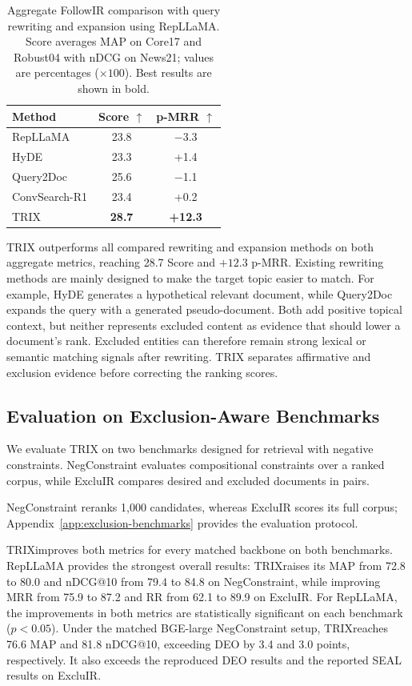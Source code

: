 \documentclass[letterpaper]{article}
\newcommand{\method}{\ifmmode \mathrm{TRIX}\else TRIX\xspace\fi}
\begin{document}
\begin{table}[t]
\centering
\small
\setlength{\tabcolsep}{5pt}
\begin{tabular}{lcc}
\toprule
\textbf{Method} & \textbf{Score $\uparrow$} & \textbf{p-MRR $\uparrow$} \\
\midrule
RepLLaMA & 23.8 & $-$3.3 \\
HyDE & 23.3 & +1.4 \\
Query2Doc & 25.6 & $-$1.1 \\
ConvSearch-R1 & 23.4 & +0.2 \\
\method{} & \textbf{28.7} & \textbf{+12.3} \\
\bottomrule
\end{tabular}
\caption{Aggregate FollowIR comparison with query rewriting and expansion
using RepLLaMA.  Score averages MAP on Core17 and Robust04 with nDCG on
News21; values are percentages ($\times100$).  Best results are shown in
bold.}
\label{tab:followir-full}
\end{table}

\method{} outperforms all compared rewriting and expansion methods on both
aggregate metrics, reaching 28.7 Score and $+12.3$ p-MRR.  Existing rewriting
methods are mainly designed to make the target topic easier to match.  For
example, HyDE generates a hypothetical relevant document, while Query2Doc
expands the query with a generated pseudo-document.  Both add positive topical
context, but neither represents excluded content as evidence that should lower
a document's rank.  Excluded entities can therefore remain strong lexical or
semantic matching signals after rewriting.  \method{} separates
affirmative and exclusion evidence before correcting the ranking scores. 

\subsection{Evaluation on Exclusion-Aware Benchmarks}
\label{sec:exclusion-transfer}

We evaluate \method{} on two benchmarks designed for retrieval with negative
constraints.  NegConstraint \cite{xu2025logical} evaluates compositional
constraints over a ranked corpus, while ExcluIR
\cite{DBLP:conf/aaai/ZhangZ0PRRCR25} compares desired and excluded documents in
pairs.

NegConstraint reranks 1,000 candidates, whereas ExcluIR scores its full corpus;
Appendix~\ref{app:exclusion-benchmarks} provides the evaluation protocol.

\method improves both metrics for every matched backbone on both benchmarks.
RepLLaMA provides the strongest overall results: \method raises its
MAP from 72.8 to 80.0 and nDCG@10 from 79.4 to 84.8 on NegConstraint, while
improving MRR from 75.9 to 87.2 and RR from 62.1 to 89.9 on ExcluIR.
For RepLLaMA, the improvements in both metrics are statistically significant
on each benchmark ($p<0.05$).
Under the matched BGE-large NegConstraint setup, \method reaches 76.6 MAP and
81.8 nDCG@10, exceeding DEO by 3.4 and 3.0 points, respectively.  It also
exceeds the reproduced DEO results and the reported SEAL results on ExcluIR.
\end{document}
